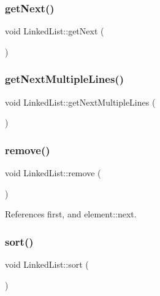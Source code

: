 \mbox{\label{classLinkedList_aca8ae729f5444f1ec2961211dc656402}} 
\subsubsection{get\+Next()}
{\footnotesize\ttfamily void Linked\+List\+::get\+Next (\begin{DoxyParamCaption}{ }\end{DoxyParamCaption})}

\mbox{\label{classLinkedList_aad3d3abf7fb17435abe44b1d00b7ac2b}} 
\subsubsection{get\+Next\+Multiple\+Lines()}
{\footnotesize\ttfamily void Linked\+List\+::get\+Next\+Multiple\+Lines (\begin{DoxyParamCaption}{ }\end{DoxyParamCaption})}

\mbox{\label{classLinkedList_ae8b298be35c3590455047afb3a8df006}} 
\subsubsection{remove()}
{\footnotesize\ttfamily void Linked\+List\+::remove (\begin{DoxyParamCaption}{ }\end{DoxyParamCaption})}



References first, and element\+::next.

\mbox{\label{classLinkedList_aa858f93cff2d7fb52b54019c413912c5}} 
\subsubsection{sort()}
{\footnotesize\ttfamily void Linked\+List\+::sort (\begin{DoxyParamCaption}{ }\end{DoxyParamCaption})}



